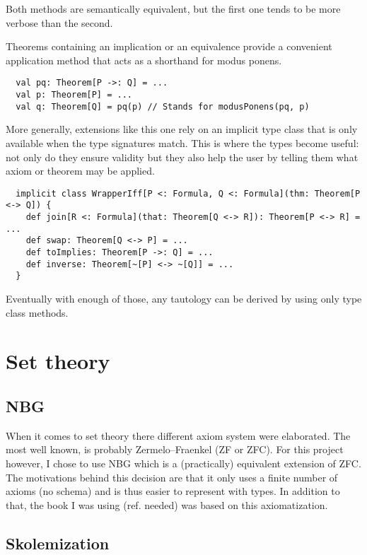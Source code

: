 \documentclass[acmlarge]{acmart}
\begin{document}
Both methods are semantically equivalent, but the first one tends to be more verbose than the second.


Theorems containing an implication or an equivalence provide a convenient application method that acts as a shorthand for modus ponens.

\begin{verbatim}
  val pq: Theorem[P ->: Q] = ...
  val p: Theorem[P] = ...
  val q: Theorem[Q] = pq(p) // Stands for modusPonens(pq, p)
\end{verbatim}

More generally, extensions like this one rely on an implicit type class that is only available when the type signatures match. This is where the types become useful: not only do they ensure validity but they also help the user by telling them what axiom or theorem may be applied.

\begin{verbatim}
  implicit class WrapperIff[P <: Formula, Q <: Formula](thm: Theorem[P <-> Q]) {
    def join[R <: Formula](that: Theorem[Q <-> R]): Theorem[P <-> R] = ...
    def swap: Theorem[Q <-> P] = ...
    def toImplies: Theorem[P ->: Q] = ...
    def inverse: Theorem[~[P] <-> ~[Q]] = ...
  }
\end{verbatim}

Eventually with enough of those, any tautology can be derived by using only type class methods.



\section{Set theory}

\subsection{NBG}

When it comes to set theory there different axiom system were elaborated. The most well known, is probably Zermelo–Fraenkel (ZF or ZFC). For this project however, I chose to use NBG which is a (practically) equivalent extension of ZFC. The motivations behind this decision are that it only uses a finite number of axioms (no schema) and is thus easier to represent with types. In addition to that, the book I was using (ref. needed) was based on this axiomatization.

\subsection{Skolemization}
\end{document}
